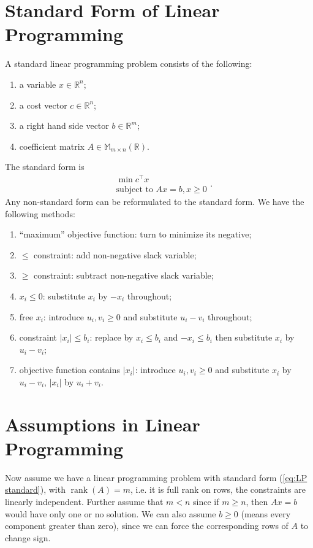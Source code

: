 \documentclass[12pt,a4paper]{report}
\numberwithin{equation}{section}
\theoremstyle{mystyle}
\newcommand{\R}{\mathbb{R}}
\newcommand{\T}{\top}
\newcommand{\rank}{\operatorname{rank}}
\newcommand{\abs}[1]{\left\lvert #1 \right\rvert}
\begin{document}
	\section{Standard Form of Linear Programming}
	A standard linear programming problem consists of the following:
	\begin{enumerate}
		\item a variable $x\in \R^n$;
		\item a cost vector $c\in \R^n$;
		\item a right hand side vector $b\in \R^m$;
		\item coefficient matrix $A\in \mathbb{M}_{m\times n}(\R)$.
	\end{enumerate}
	The standard form is 
	\begin{equation}\label{eq:LP standard}
		\begin{split}
			&\min c^\T x\\
			&\text{subject to }Ax=b, x\geq0
		\end{split}.
	\end{equation}
	Any non-standard form can be reformulated to the standard form. We have the following methods:
	\begin{enumerate}
		\item ``maximum'' objective function: turn to minimize its negative;
		\item $\leq $ constraint: add non-negative slack variable;
		\item $\geq $ constraint: subtract non-negative slack variable;
		\item $x_i\leq 0$: substitute $x_i$ by $-x_i$ throughout;
		\item free $x_i$: introduce $u_i,v_i\geq 0$ and substitute $u_i-v_i$ throughout;
		\item constraint $\abs{x_i}\leq b_i$: replace by $x_i\leq b_i$ and $-x_i\leq b_i$ then substitute $x_i$ by $u_i-v_i$;
		\item objective function contains $|x_i|$: introduce $u_i,v_i\geq 0$ and substitute $x_i$ by $u_i-v_i$, $|x_i|$ by $u_i+v_i$.
	\end{enumerate}

	\section{Assumptions in Linear Programming}
	Now assume we have a linear programming problem with standard form (\ref{eq:LP standard}), with $\rank(A)=m$, i.e. it is full rank on rows, the constraints are linearly independent. Further assume that $m<n$ since if $m\geq n$, then $Ax=b$ would have only one or no solution. We can also assume $b\geq 0$ (means every component greater than zero), since we can force the corresponding rows of $A$ to change sign. 
	
\end{document}

